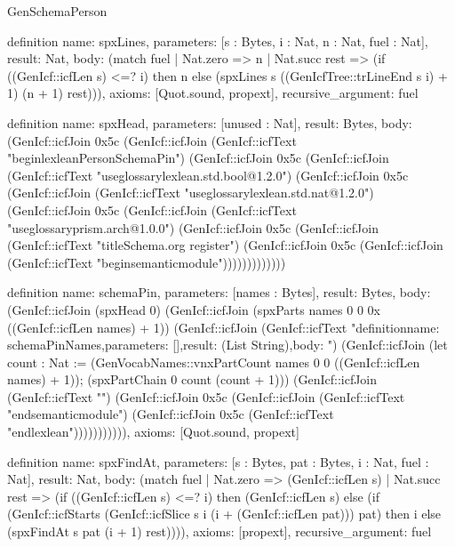 \begin{lexlean}{GenSchemaPerson}
\begin{semanticmodule}
definition{
  name: spxLines,
  parameters: [s : Bytes, i : Nat, n : Nat, fuel : Nat],
  result: Nat,
  body: (match fuel
    | Nat.zero => n
    | Nat.succ rest => (if ((GenIcf::icfLen s) <=? i) then n else (spxLines s ((GenIcfTree::trLineEnd s i) + 1) (n + 1) rest))),
  axioms: [Quot.sound, propext],
  recursive_argument: fuel
}

definition{
  name: spxHead,
  parameters: [unused : Nat],
  result: Bytes,
  body: (GenIcf::icfJoin 0x5c (GenIcf::icfJoin (GenIcf::icfText "begin{lexlean}{PersonSchemaPin}\n") (GenIcf::icfJoin 0x5c (GenIcf::icfJoin (GenIcf::icfText "useglossary{lexlean.std.bool@1.2.0}\n") (GenIcf::icfJoin 0x5c (GenIcf::icfJoin (GenIcf::icfText "useglossary{lexlean.std.nat@1.2.0}\n") (GenIcf::icfJoin 0x5c (GenIcf::icfJoin (GenIcf::icfText "useglossary{prism.arch@1.0.0}\n") (GenIcf::icfJoin 0x5c (GenIcf::icfJoin (GenIcf::icfText "title{Schema.org register}\n") (GenIcf::icfJoin 0x5c (GenIcf::icfJoin (GenIcf::icfText "begin{semanticmodule}\n\n")))))))))))))
}

definition{
  name: schemaPin,
  parameters: [names : Bytes],
  result: Bytes,
  body: (GenIcf::icfJoin (spxHead 0) (GenIcf::icfJoin (spxParts names 0 0 0x ((GenIcf::icfLen names) + 1)) (GenIcf::icfJoin (GenIcf::icfText "definition{\n  name: schemaPinNames,\n  parameters: [],\n  result: (List String),\n  body: ") (GenIcf::icfJoin (let count : Nat := (GenVocabNames::vnxPartCount names 0 0 ((GenIcf::icfLen names) + 1)); (spxPartChain 0 count (count + 1))) (GenIcf::icfJoin (GenIcf::icfText "\n}\n{}\n") (GenIcf::icfJoin 0x5c (GenIcf::icfJoin (GenIcf::icfText "end{semanticmodule}\n") (GenIcf::icfJoin 0x5c (GenIcf::icfText "end{lexlean}\n"))))))))))),
  axioms: [Quot.sound, propext]
}

definition{
  name: spxFindAt,
  parameters: [s : Bytes, pat : Bytes, i : Nat, fuel : Nat],
  result: Nat,
  body: (match fuel
    | Nat.zero => (GenIcf::icfLen s)
    | Nat.succ rest => (if ((GenIcf::icfLen s) <=? i) then (GenIcf::icfLen s) else (if (GenIcf::icfStarts (GenIcf::icfSlice s i (i + (GenIcf::icfLen pat))) pat) then i else (spxFindAt s pat (i + 1) rest)))),
  axioms: [propext],
  recursive_argument: fuel
}


\end{semanticmodule}
\end{lexlean}
